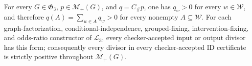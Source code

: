 For every \(G\in\mathfrak G_3\), \(p\in\mathcal M_+(G)\), and \(q=C_{\#}p\), one has \(q_w>0\) for every \(w\in\mathcal W\), and therefore \(q(A)=\sum_{w\in A}q_w>0\) for every nonempty \(A\subseteq\mathcal W\). For each graph-factorization, conditional-independence, grouped-fixing, intervention-fixing, and odds-ratio constructor of \(\mathcal L_3\), every checker-accepted input or output divisor has this form; consequently every divisor in every checker-accepted \(\mathrm{ID}\) certificate is strictly positive throughout \(\mathcal M_+(G)\).